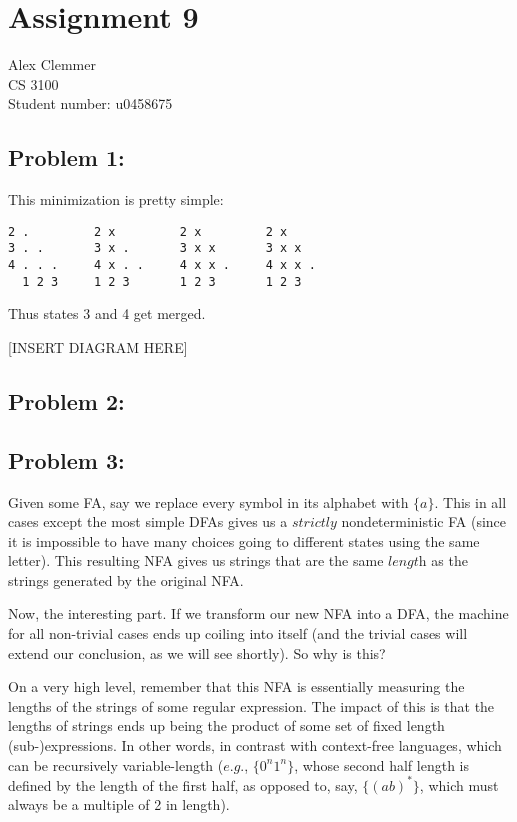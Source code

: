 \documentclass[a4paper]{article}
\begin{document}
\section*{Assignment 9}
Alex Clemmer\\
CS 3100 \\
Student number: u0458675

\subsection*{Problem 1:}

This minimization is pretty simple:

\begin{verbatim}
2 .         2 x         2 x         2 x
3 . .       3 x .       3 x x       3 x x
4 . . .     4 x . .     4 x x .     4 x x .
  1 2 3     1 2 3       1 2 3       1 2 3       
\end{verbatim}

Thus states 3 and 4 get merged.

[INSERT DIAGRAM HERE]


\subsection*{Problem 2:} 

\subsection*{Problem 3:}

Given some FA, say we replace every symbol in its alphabet with $\{a\}$. This in all cases except the most simple DFAs gives us a $\textit{strictly}$ nondeterministic FA (since it is impossible to have many choices going to different states using the same letter). This resulting NFA gives us strings that are the same $\textit{length}$ as the strings generated by the original NFA.

Now, the interesting part. If we transform our new NFA into a DFA, the machine for all non-trivial cases ends up coiling into itself (and the trivial cases will extend our conclusion, as we will see shortly). So why is this?

On a very high level, remember that this NFA is essentially measuring the lengths of the strings of some regular expression. The impact of this is that the lengths of strings ends up being the product of some set of fixed length (sub-)expressions. In other words, in contrast with context-free languages, which can be recursively variable-length ($\textit{e.g.}$, $\{0^n 1^n\}$, whose second half length is defined by the length of the first half, as opposed to, say, $\{(ab)^*\}$, which must always be a multiple of 2 in length).
\end{document}
